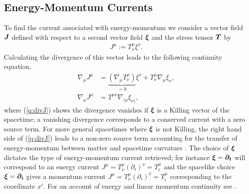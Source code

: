 \subsection{Energy-Momentum Currents} \label{q:sect:mattercont}
To find the current associated with energy-momentum we consider a vector field $\boldsymbol{J}$ defined with respect to a second vector field $\boldsymbol{\xi}$ and the stress tensor $\boldsymbol{T}$ by
\begin{align}
\label{q:Killing current}J^\mu := T^\mu_\nu \xi^\nu.
\end{align}
Calculating the divergence of this vector leads to the following continuity equation,
\begin{align}
\nabla_\mu J^\mu &= \underbrace{(\nabla_\mu T^\mu_\nu )}_{=0}\xi^\nu + T^\mu_\nu \nabla_\mu  \xi_\nu, \\
\label{q:divJ}\nabla_\mu J^\mu &= T^{\mu\nu} \nabla_{(\mu}  \xi_{\nu)},
\end{align}
where (\ref{q:divJ}) shows the divergence vanishes if $\boldsymbol{\xi}$ is a Killing vector of the spacetime; a vanishing divergence corresponds to a conserved current with a zero source term. For more general spacetimes where $\boldsymbol{\xi}$ is not Killing, the right hand side of (\ref{q:divJ}) leads to a non-zero source term accounting for the transfer of energy-momentum between matter and spacetime curvature \cite{Clough_2021}. The choice of $\boldsymbol{\xi}$ dictates the type of energy-momentum current retrieved; for instance $\boldsymbol{\xi} = \boldsymbol{\partial_t}$ will correspond to an energy current $J^\mu = T^\mu_\nu (\partial_t)^\nu = T^\mu_t$ and the spacelike choice $\boldsymbol{\xi} = \boldsymbol{\partial_i}$ gives a momentum current $J^\mu = T^\mu_\nu (\partial_i)^\nu=T^\mu_i$ corresponding to the coordinate $x^i$. For an account of energy and linear momentum continuity see \cite{Clough_2021}.




